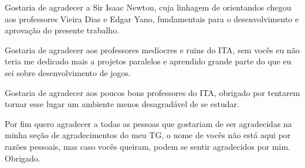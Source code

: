 Gostaria de agradecer a Sir Isaac Newton, cuja linhagem de orientandos chegou aos professores Vieira Dias e Edgar Yano, fundamentais para o desenvolvimento e aprovação do presente trabalho.

Gostaria de agradecer aos professores medíocres e ruins do ITA, sem vocês eu não teria me dedicado mais a projetos paralelos e aprendido grande parte do que eu sei sobre desenvolvimento de jogos.

Gostaria de agradecer aos poucos bons professores do ITA, obrigado por tentarem tornar esse lugar um ambiente menos desagradável de se estudar.

Por fim quero agradecer a todas as pessoas que gostariam de ser agradecidas na minha seção de agradecimentos do meu TG, o nome de vocês não está aqui por razões pessoais, mas caso vocês queiram, podem se sentir agradecidos por mim. Obrigado.

